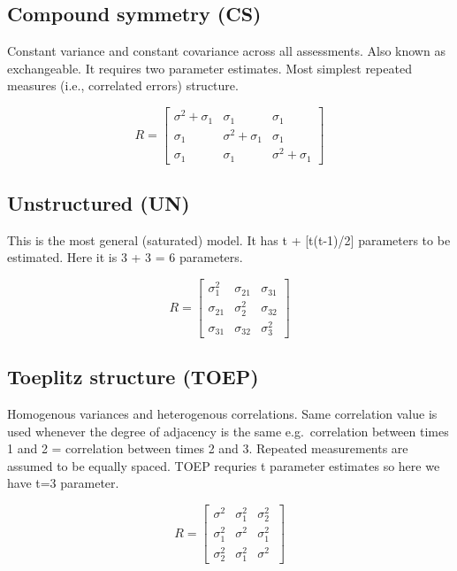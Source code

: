 \documentclass[
  letterpaper,
  DIV=11,
  numbers=noendperiod]{scrreprt}
\begin{document}
\hypertarget{compound-symmetry-cs}{%
\subsection{Compound symmetry (CS)}\label{compound-symmetry-cs}}

Constant variance and constant covariance across all assessments. Also
known as exchangeable. It requires two parameter estimates. Most
simplest repeated measures (i.e., correlated errors) structure.

\[ R = \begin{bmatrix}
   \sigma^2 + \sigma_1 & \sigma_1  & \sigma_1  \\
   \sigma_1  & \sigma^2 + \sigma_1  & \sigma_1  \\
   \sigma_1  & \sigma_1  & \sigma^2 + \sigma_1
   \end{bmatrix}\]

\hypertarget{unstructured-un}{%
\subsection{Unstructured (UN)}\label{unstructured-un}}

This is the most general (saturated) model. It has t + {[}t(t-1)/2{]}
parameters to be estimated. Here it is 3 + 3 = 6 parameters.

\[ R = \begin{bmatrix}
   \sigma_1^2 & \sigma_{21}  & \sigma_{31}  \\
   \sigma_{21}  & \sigma_2^2   & \sigma_{32}  \\
   \sigma_{31}  & \sigma_{32}  & \sigma_3^2
   \end{bmatrix}\]

\hypertarget{toeplitz-structure-toep}{%
\subsection{Toeplitz structure (TOEP)}\label{toeplitz-structure-toep}}

Homogenous variances and heterogenous correlations. Same correlation
value is used whenever the degree of adjacency is the same
e.g.~correlation between times 1 and 2 = correlation between times 2 and
3. Repeated measurements are assumed to be equally spaced. TOEP requries
t parameter estimates so here we have t=3 parameter.

\[ R = \begin{bmatrix}
   \sigma^2  & \sigma_1^2 & \sigma_2^2 \  \\
   \sigma_1^2 & \sigma^2  & \sigma_1^2  \\
   \sigma_2^2  & \sigma_1^2 & \sigma^2 
   \end{bmatrix}\]
\end{document}
